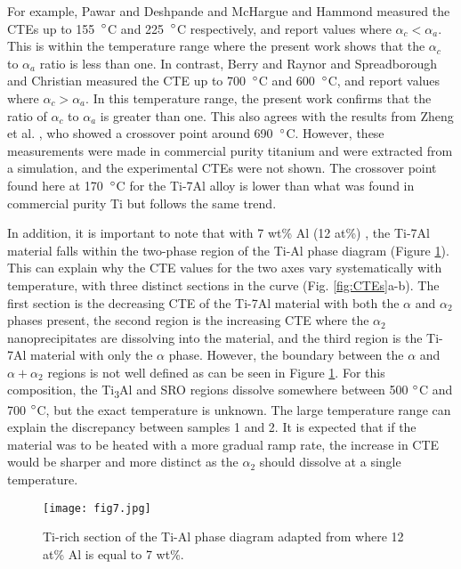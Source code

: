 \documentclass[3p]{elsarticle}
\begin{document}
	For example, Pawar and Deshpande \cite{Pawar1968} and McHargue and Hammond \cite{Mchargue1953} measured the CTEs up to 155~$\degree$C and 225~$\degree$C respectively, and report values where $\alpha_c < \alpha_a$. This is within the temperature range where the present work shows that the $\alpha_c$ to $ \alpha_a$ ratio is less than one. In contrast, Berry and Raynor \cite{Berry1953} and Spreadborough and Christian \cite{Spreadborough1959} measured the CTE up to 700~$\degree$C and 600~$\degree$C, and report values where $\alpha_c > \alpha_a$. In this temperature range, the present work confirms that the ratio of $\alpha_c$ to $ \alpha_a$ is greater than one. This also agrees with the results from Zheng et al. \cite{Zheng2019}, who showed a crossover point around 690~$\degree$C. However, these measurements were made in commercial purity titanium and were extracted from a simulation, and the experimental CTEs were not shown. The crossover point found here at 170~$\degree$C for the Ti-7Al alloy is lower than what was found in commercial purity Ti \cite{Zheng2019} but follows the same trend.

	In addition, it is important to note that with 7 wt\% Al (12 at\%) , the Ti-7Al material falls within the two-phase region of the Ti-Al phase diagram (Figure \ref{fig:phase_diagram}). This can explain why the CTE values for the two axes vary systematically with temperature, with three distinct sections in the curve (Fig. \ref{fig:CTEs}a-b). The first section is the decreasing CTE of the Ti-7Al material with both the $\alpha$ and $\alpha_2$ phases present, the second region is the increasing CTE where the $\alpha_2$ nanoprecipitates are dissolving into the material, and the third region is the Ti-7Al material with only the $\alpha$ phase. However, the boundary between the $\alpha$ and $\alpha + \alpha_2$ regions is not well defined as can be seen in Figure \ref{fig:phase_diagram}. For this composition, the Ti\textsubscript{3}Al and SRO regions dissolve somewhere between 500 $\degree$C and 700 $\degree$C, but the exact temperature is unknown. The large temperature range can explain the discrepancy between samples 1 and 2. It is expected that if the material was to be heated with a more gradual ramp rate, the increase in CTE would be sharper and more distinct as the $\alpha_2$ should dissolve at a single temperature.
	
	\begin{figure}[h!]
		\centering
		\texttt{[image: fig7.jpg]}
		\caption{Ti-rich section of the Ti-Al phase diagram adapted from  \cite{Blackburn1969,Swartzendruber1981,Namboodhiri1973,Namboodhiri1983} where 12 at\% Al is equal to 7 wt\%.}
		\label{fig:phase_diagram}
	\end{figure}
\end{document}
